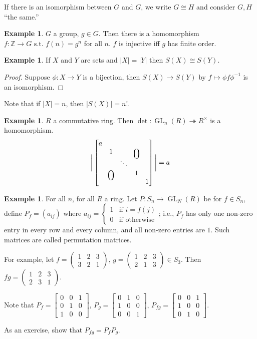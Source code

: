 \documentclass{amsart}
\theoremstyle{definition}
\newtheorem{example}[thm]{Example}
\newcommand{\Z}{\mathbb Z}
\newcommand{\st}{\text{ s.t. }}
\DeclareMathOperator{\GL}{GL}
\newcommand\bigzero{\makebox(0,0){\text{\huge0}}}
\begin{document}
If there is an isomorphism between $G$ and $G$, we write $G\cong H$ and consider $G,H$ ``the same.''

\begin{example}
	$G$ a group, $g\in G$. Then there is a homomorphism $f:\Z\to G\st f(n)=g^n$ for all $n$. $f$ is injective iff $g$ has finite order. 
\end{example}
\begin{example}
	If $X$ and $Y$ are sets and $|X|=|Y|$ then $S(X)\cong S(Y)$.
\end{example}
\begin{proof}
	Suppose $\phi:X\to Y$ is a bijection, then $S(X)\to S(Y)$ by $f\mapsto \phi f\phi^{-1}$ is an isomorphism.
\end{proof}
Note that if $|X|=n$, then $|S(X)|=n!$.
\begin{example}
	$R$ a commutative ring. Then $\det:\GL_n(R)\twoheadrightarrow R^\times$ is a homomorphism.
	$$\bigg\vert\begin{bmatrix}
a&&&\\
&1&&\bigzero&\\
&&\ddots&&\\
&\bigzero&&1&\\
&&&&1
\end{bmatrix}
\bigg|=a$$
\end{example}
\begin{example}
	For all $n$, for all $R$ a ring. Let $P:S_n\to\GL_N(R)$ be for $f\in S_n$, define $P_f=(a_{ij})$ where $a_{ij}=\begin{cases}
		1&\text{if }i=f(j)\\
		0&\text{if otherwise}
	\end{cases}$; i.e., $P_f$ has only one non-zero entry in every row and every column, and all non-zero entries are $1$. Such matrices are called permutation matrices.
	
	For example, let $f=\begin{pmatrix}
		1&2&3\\3&2&1
	\end{pmatrix}$, $g=\begin{pmatrix}
		1&2&3\\2&1&3
	\end{pmatrix}\in S_3$. Then $fg=\begin{pmatrix}
		1&2&3\\2&3&1
	\end{pmatrix}$.
	
	Note that $P_f=\begin{bmatrix}
		0&0&1\\0&1&0\\1&0&0
	\end{bmatrix}$, $P_g=\begin{bmatrix}
		0&1&0\\1&0&0\\0&0&1
	\end{bmatrix}$, $P_{fg}=\begin{bmatrix}
		0&0&1\\1&0&0\\0&1&0
	\end{bmatrix}$.
\end{example}
As an exercise, show that $P_{fg}=P_fP_g$.
\end{document}
